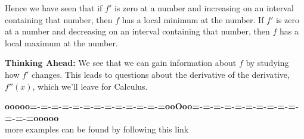 \documentclass{ximera}
\begin{document}
Hence we have seen that if $f'$ is zero at a number and increasing on an interval containing that  number,
then $f$ has a local minimum at the number. If $f'$ is zero at a number and
decreasing on an interval containing that number, then $f$ has a local maximum at the
number. 



\textbf{\textcolor{blue!55!black}{Thinking Ahead:}} We see that we can gain information about $f$ by
studying how $f'$ changes. This leads to questions about the derivative of the derivative, $f''(x)$, which we'll leave for Calculus.











\begin{onlineOnly}
\begin{center}
\textbf{\textcolor{green!50!black}{ooooo=-=-=-=-=-=-=-=-=-=-=-=-=ooOoo=-=-=-=-=-=-=-=-=-=-=-=-=ooooo}} \\

more examples can be found by following this link\\ 

\end{center}
\end{onlineOnly}
\end{document}
